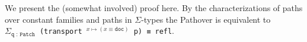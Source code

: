 \begin{code}%
\>[0]\AgdaSpace{}%
\AgdaSymbol{:}%
\>[958I]\AgdaSymbol{\{}\AgdaSpace{}%
\AgdaSymbol{:}\AgdaSpace{}%
\AgdaSymbol{\}}\AgdaSpace{}%
\<%
\\
\>[.][@{}l@{}]\<[958I]%
\>[4]\AgdaSymbol{(}\AgdaSpace{}%
\AgdaSpace{}%
\AgdaSpace{}%
\AgdaSpace{}%
\AgdaFunction{Σ[}\AgdaSpace{}%
\AgdaSpace{}%
\AgdaSpace{}%
\AgdaSpace{}%
\AgdaFunction{]}\AgdaSpace{}%
\AgdaSpace{}%
\AgdaSpace{}%
\AgdaSpace{}%
\AgdaSymbol{)}\AgdaSpace{}%
\AgdaSymbol{(}\AgdaSpace{}%
\AgdaOperator{\AgdaInductiveConstructor{,}}\AgdaSpace{}%
\AgdaSymbol{)}\AgdaSpace{}%
\AgdaSymbol{(}\AgdaSpace{}%
\AgdaOperator{\AgdaInductiveConstructor{,}}\AgdaSpace{}%
\AgdaSymbol{))}\<%
\\
%
\>[4]\AgdaSpace{}%
\AgdaSymbol{(}\AgdaFunction{Σ[}\AgdaSpace{}%
\AgdaSpace{}%
\AgdaSpace{}%
\AgdaSpace{}%
\AgdaFunction{]}\AgdaSpace{}%
\AgdaSpace{}%
\AgdaSpace{}%
\AgdaSymbol{)}\<%
\end{code}
\begin{code}[hide]%
\>[0]%
\>[988I]\AgdaSymbol{\{}\AgdaSymbol{\}}\AgdaSpace{}%
\AgdaSymbol{=}\<%
\end{code}
We present the (somewhat involved) proof here.
By the characterizations of paths over constant families and paths in $\Sigma$-types the Pathover
is equivalent to \texttt{$\Sigma_\texttt{q : Patch}$ (transport $^{x \mapsto (x ≡ \texttt{doc})}$ p) ≡ refl}.

